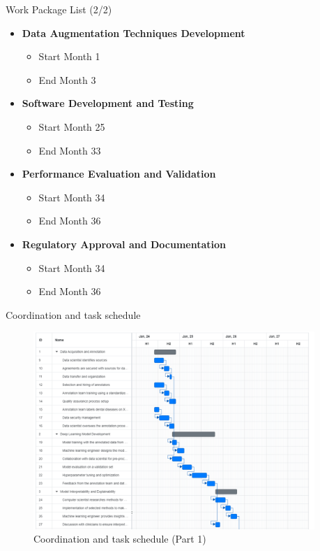 \documentclass{beamer}
\begin{document}
\begin{frame}{Work Package List (2/2)}
  \begin{itemize}
    \item \textbf{Data Augmentation Techniques Development}
          \begin{itemize}
            \item Start Month 1
            \item End Month 3
          \end{itemize}

    \item \textbf{Software Development and Testing}
          \begin{itemize}
            \item Start Month 25
            \item End Month 33
          \end{itemize}

    \item \textbf{Performance Evaluation and Validation}
          \begin{itemize}
            \item Start Month 34
            \item End Month 36
          \end{itemize}

    \item \textbf{Regulatory Approval and Documentation}
          \begin{itemize}
            \item Start Month 34
            \item End Month 36
          \end{itemize}
  \end{itemize}
\end{frame}


\begin{frame}{Coordination and task schedule}

  \begin{figure}
    \includegraphics[width = 0.95\textwidth]{fig/tasks1.png}
    \caption{Coordination and task schedule (Part 1)}
  \end{figure}

\end{frame}
\end{document}
